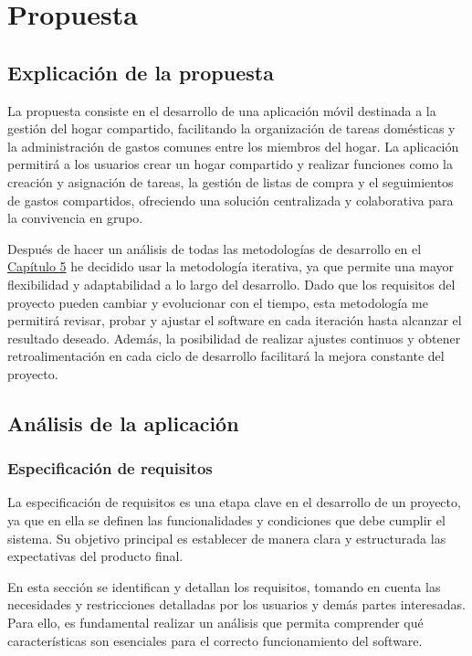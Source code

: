 \chapter{Propuesta}
\label{cap:propuesta}

\section{Explicación de la propuesta}
\label{sec:explicacion_propuesta}

La propuesta consiste en el desarrollo de una aplicación móvil destinada a la gestión del hogar compartido, facilitando la organización 
de tareas domésticas y la administración de gastos comunes entre los miembros del hogar. La aplicación permitirá a los usuarios
crear un hogar compartido y realizar funciones como la creación y asignación de tareas, la gestión de listas de compra y el seguimientos de  
gastos compartidos, ofreciendo una solución centralizada y colaborativa para la convivencia en grupo. 

Después de hacer un análisis de todas las metodologías de desarrollo en el {\hyperref[cap:analisis_metodologías]{Capítulo 5}} he decidido usar la metodología iterativa, ya que permite una mayor flexibilidad y adaptabilidad a lo largo del desarrollo. 
Dado que los requisitos del proyecto pueden cambiar y evolucionar con el tiempo, esta metodología me permitirá revisar, probar y ajustar el software en cada iteración hasta alcanzar el resultado deseado. 
Además, la posibilidad de realizar ajustes continuos y obtener retroalimentación en cada ciclo de desarrollo facilitará la mejora constante del proyecto.

\newpage

\section{Análisis de la aplicación}


\subsection{Especificación de requisitos}
\label{sec:requisitos}
La especificación de requisitos es una etapa clave en el desarrollo de un proyecto, ya que en ella se definen las funcionalidades y condiciones que debe cumplir el sistema. Su objetivo principal
es establecer de manera clara y estructurada las expectativas del producto final.

En esta sección se identifican y detallan los requisitos, tomando en cuenta las necesidades y restricciones detalladas por los 
usuarios y demás partes interesadas. Para ello, es fundamental realizar un análisis que permita comprender qué características son esenciales 
para el correcto funcionamiento del software.

